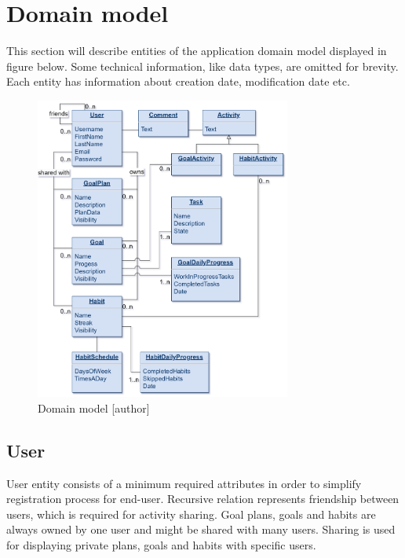 
\section{Domain model}\label{sec:domain-model}

This section will describe entities of the application domain model displayed in figure below.
Some technical information, like data types, are omitted for brevity.
Each entity has information about creation date, modification date etc.

\begin{figure}[h]
    \includegraphics[width=0.75\textwidth]{images/pda-domain-model}
    \caption{Domain model [author]}
    \label{fig:domain-model}
\end{figure}


\subsection{User}\label{subsec:user}

User entity consists of a minimum required attributes in order to simplify registration process for end-user.
Recursive relation represents friendship between users, which is required for activity sharing.
Goal plans, goals and habits are always owned by one user and might be shared with many users.
Sharing is used for displaying private plans, goals and habits with specific users.

